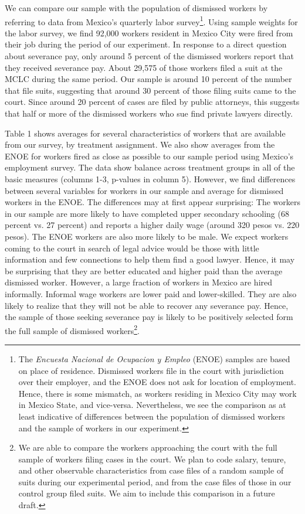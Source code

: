 \documentclass[12 pt]{article}
\begin{document}
We can compare our sample with the population of dismissed workers by referring to data from Mexico’s quarterly labor survey\footnote{The \emph{Encuesta Nacional de Ocupacion y Empleo} (ENOE) samples are based on place of residence. Dismissed workers file in the court with jurisdiction over their employer, and the ENOE does not ask for location of employment. Hence, there is some mismatch, as workers residing in Mexico City may work in Mexico State, and vice-versa. Nevertheless, we see the comparison as at least indicative of differences between the population of dismissed workers and the sample of workers in our experiment. }.  Using sample weights for the labor survey, we find 92,000 workers resident in Mexico City were fired from their job during the period of our experiment. In response to a direct question about severance pay, only around 5 percent of the dismissed workers report that they received severance pay. About 29,575 of those workers filed a suit at the MCLC during the same period. Our sample is around 10 percent of the number that file suits, suggesting that around 30 percent of those filing suits came to the court. Since around 20 percent of cases are filed by public attorneys, this suggests that half or more of the dismissed workers who sue find private lawyers directly. 

Table 1 shows averages for several characteristics of workers that are available from our survey, by treatment assignment. We also show averages from the ENOE for workers fired as close as possible to our sample period using Mexico’s employment survey. The data show balance across treatment groups in all of the basic measures (columns 1-3, p-values in column 5). However, we find differences between several variables for workers in our sample and average for dismissed workers in the ENOE. The differences may at first appear surprising: The workers in our sample are more likely to have completed upper secondary schooling (68 percent vs. 27 percent) and reports a higher daily wage (around 320 pesos vs. 220 pesos). The ENOE workers are also more likely to be male. We expect workers coming to the court in search of legal advice would be those with little information and few connections to help them find a good lawyer. Hence, it may be surprising that they are better educated and higher paid than the average dismissed worker. However, a large fraction of workers in Mexico are hired informally. Informal wage workers are lower paid and lower-skilled. They are also likely to realize that they will not be able to recover any severance pay. Hence, the sample of those seeking severance pay is likely to be positively selected form the full sample of dismissed workers\footnote{We are able to compare the workers approaching the court with the full sample of workers filing cases in the court. We plan to code salary, tenure, and other observable characteristics from case files of a random sample of suits during our experimental period, and from the case files of those in our control group filed suits. We aim to include this comparison in a future draft. }.  
\end{document}
